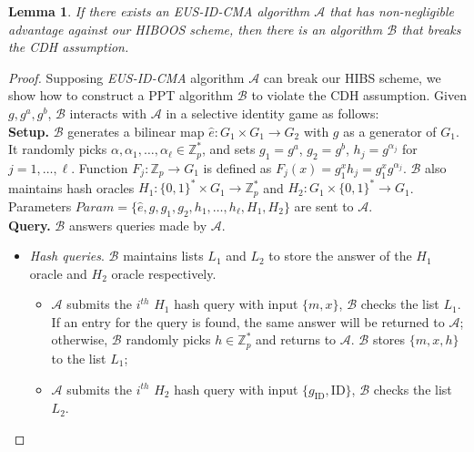 \documentclass[times]{secauth}
\newtheorem{lemma}[theorem]{Lemma}
\theoremstyle{definition}
\theoremstyle{remark}
\begin{document}
\begin{lemma} \label{lemma-eus-hibs}
If there exists an EUS-ID-CMA algorithm $\mathcal{A}$ that has non-negligible advantage against our HIBOOS scheme, 
then there is an algorithm $\mathcal{B}$ that breaks the CDH assumption.
\end{lemma}
\begin{proof}
Supposing \emph{EUS-ID-CMA} algorithm $\mathcal{A}$ can break our HIBS scheme, we show how to construct a PPT algorithm $\mathcal{B}$ to violate the CDH assumption. 
Given $g, g^a, g^b$, $\mathcal{B}$ interacts with $\mathcal{A}$ in a selective identity game as follows:
\vspace{0.2cm}
\\
\textbf{Setup.}
$\mathcal{B}$ generates a bilinear map $\hat{e}: G_1 \times G_1 \rightarrow G_2$ with $g$ as a generator of $G_1$.
It randomly picks $\alpha, \alpha_1, \ldots, \alpha_\ell \in \mathbb{Z}^*_p$, and sets $g_1 = g^a$, $g_2 = g^b$, $h_j =g^{\alpha_j}$ for $j = 1, \ldots, \ell$.
Function $F_j : \mathbb{Z}_p \rightarrow G_1$ is defined as $F_j(x)=g_1^xh_j =g_1^{x}g^{\alpha_j}$.
$\mathcal{B}$ also maintains hash oracles $H_1: \{0, 1\}^* \times G_1 \rightarrow \mathbb{Z}_p^*$ and $H_2: G_1 \times \{0, 1\}^* \rightarrow G_1$.
Parameters $Param = \{\hat{e}, g, g_1,  g_2, h_1, \ldots, h_\ell, H_1, H_2\}$ are sent to $\mathcal{A}$.
\vspace{0.2cm}
\\
\textbf{Query.}
$\mathcal{B}$ answers queries made by $\mathcal{A}$.
\begin{itemize}
	\item \emph{Hash queries}. 
	$\mathcal{B}$ maintains lists $L_1$ and $L_2$ to store the answer of the $H_1$ oracle and $H_2$ oracle respectively.
	\begin{itemize}
		\item $\mathcal{A}$ submits the $i^{th}$ $H_1$ hash query with input $\{m, x\}$,  $\mathcal{B}$ checks the list $L_1$. 
		If an entry for the query is found, the same answer will be returned to $\mathcal{A}$; otherwise, $\mathcal{B}$ randomly picks $h \in \mathbb{Z}_p^*$ and returns to $\mathcal{A}$.
		$\mathcal{B}$ stores $\{m, x, h\}$ to the list $L_1$;
		\item $\mathcal{A}$ submits the $i^{th}$ $H_2$ hash query with input $\{g_\mathrm{ID}, \mathrm{ID}\}$, $\mathcal{B}$ checks the list $L_2$. 

\end{itemize}
\end{itemize}
\end{proof}
\end{document}
